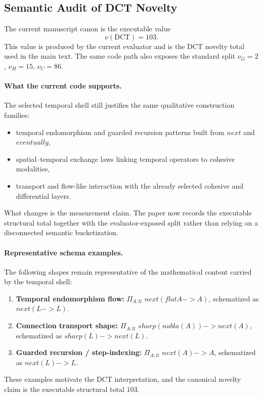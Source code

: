 \documentclass[11pt,a4paper]{article}
\def\to{->}%
\def\nabla{nabla}%
\def\flat{flat}%
\def\sharp{sharp}%
\def\bigcirc{next}%
\def\Diamond{eventually}%
\theoremstyle{plain}
\theoremstyle{definition}
\theoremstyle{remark}
\newcommand{\U}{\mathcal{U}}
\begin{document}
\subsection{Semantic Audit of DCT Novelty}
\label{tab:nu-audit}

The current manuscript canon is the executable value
\[
  \nu(\text{DCT}) = 103.
\]
This value is produced by the current evaluator and is the DCT novelty total used in the main text.
The same code path also exposes the standard split $\nu_G=2$, $\nu_H=15$, $\nu_C=86$.

\paragraph{What the current code supports.}
The selected temporal shell still justifies the same qualitative construction families:
\begin{itemize}[nosep]
    \item temporal endomorphism and guarded recursion patterns built from $\bigcirc$ and $\Diamond$,
    \item spatial--temporal exchange laws linking temporal operators to cohesive modalities,
    \item transport and flow-like interaction with the already selected cohesive and differential layers.
\end{itemize}
What changes is the measurement claim.
The paper now records the executable structural total together with the evaluator-exposed split rather than relying on a disconnected semantic bucketization.

\paragraph{Representative schema examples.}
The following shapes remain representative of the mathematical content carried by the temporal shell:
\begin{enumerate}[nosep]
\item \textbf{Temporal endomorphism flow:} $\Pi_{A : \U}\; \bigcirc(\flat A \to A)$, schematized as $\bigcirc(L \to L)$.
\item \textbf{Connection transport shape:} $\Pi_{A : \U}\; \sharp(\nabla(A)) \to \bigcirc(A)$, schematized as $\sharp(L) \to \bigcirc(L)$.
\item \textbf{Guarded recursion / step-indexing:} $\Pi_{A : \U}\; \bigcirc(A) \to A$, schematized as $\bigcirc(L) \to L$.
\end{enumerate}
These examples motivate the DCT interpretation, and the canonical novelty claim is the executable structural total $103$.
\end{document}
